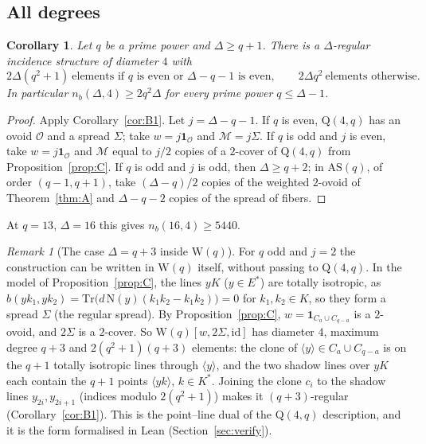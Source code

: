 \documentclass[11pt]{amsart}
\newtheorem{corollary}[theorem]{Corollary}
\theoremstyle{definition}
\theoremstyle{remark}
\newtheorem{remark}[theorem]{Remark}
\newcommand{\cO}{\mathcal{O}}
\newcommand{\cM}{\mathcal{M}}
\newcommand{\AS}{\mathrm{AS}}
\newcommand{\Wq}{\mathrm{W}}
\newcommand{\Qf}{\mathrm{Q}}
\newcommand{\Tr}{\mathrm{Tr}}
\newcommand{\Nm}{\mathrm{N}}
\begin{document}
\subsection{All degrees}
\begin{corollary}\label{cor:B2}
Let $q$ be a prime power and $\Delta\ge q+1$. There is a $\Delta$-regular incidence structure of diameter $4$ with
\[
2\Delta(q^2+1)\ \text{elements if $q$ is even or $\Delta-q-1$ is even},\qquad 2\Delta q^2\ \text{elements otherwise.}
\]
In particular $n_b(\Delta,4)\ge2q^2\Delta$ for every prime power $q\le\Delta-1$.
\end{corollary}

\begin{proof}
Apply Corollary~\ref{cor:B1}. Let $j=\Delta-q-1$. If $q$ is even, $\Qf(4,q)$ has an ovoid $\cO$ and a spread $\Sigma$; take $w=j\mathbf 1_\cO$ and $\cM=j\Sigma$. If $q$ is odd and $j$ is even, take $w=j\mathbf 1_\cO$ and $\cM$ equal to $j/2$ copies of a $2$-cover of $\Qf(4,q)$ from Proposition~\ref{prop:C}. If $q$ is odd and $j$ is odd, then $\Delta\ge q+2$; in $\AS(q)$, of order $(q-1,q+1)$, take $(\Delta-q)/2$ copies of the weighted $2$-ovoid of Theorem~\ref{thm:A} and $\Delta-q-2$ copies of the spread of fibers.
\end{proof}

At $q=13$, $\Delta=16$ this gives $n_b(16,4)\ge5440$.

\begin{remark}[The case $\Delta=q+3$ inside $\Wq(q)$]\label{rem:C1W}
For $q$ odd and $j=2$ the construction can be written in $\Wq(q)$ itself, without passing to $\Qf(4,q)$. In the model of Proposition~\ref{prop:C}, the lines $yK$ ($y\in E^*$) are totally isotropic, as $b(yk_1,yk_2)=\Tr\bigl(d\,\Nm(y)(k_1k_2-k_1k_2)\bigr)=0$ for $k_1,k_2\in K$, so they form a spread $\Sigma$ (the regular spread). By Proposition~\ref{prop:C}, $w=\mathbf 1_{C_a\cup C_{q-a}}$ is a $2$-ovoid, and $2\Sigma$ is a $2$-cover. So $\Wq(q)[w,2\Sigma,\mathrm{id}]$ has diameter $4$, maximum degree $q+3$ and $2(q^2+1)(q+3)$ elements: the clone of $\langle y\rangle\in C_a\cup C_{q-a}$ is on the $q+1$ totally isotropic lines through $\langle y\rangle$, and the two shadow lines over $yK$ each contain the $q+1$ points $\langle yk\rangle$, $k\in K^*$. Joining the clone $c_i$ to the shadow lines $y_{2i},y_{2i+1}$ (indices modulo $2(q^2+1)$) makes it $(q+3)$-regular (Corollary~\ref{cor:B1}). This is the point--line dual of the $\Qf(4,q)$ description, and it is the form formalised in Lean (Section~\ref{sec:verify}).
\end{remark}
\end{document}
